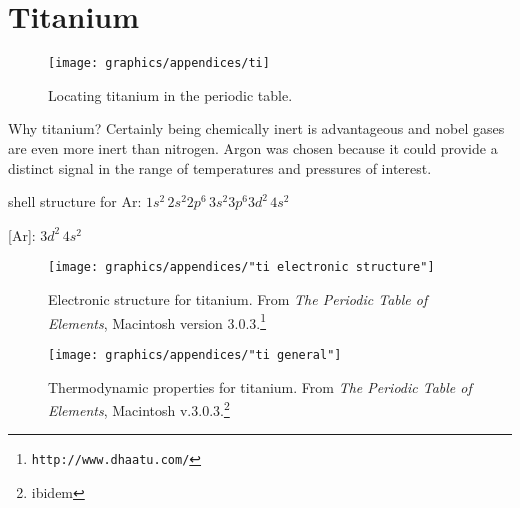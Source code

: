 \chapter{Titanium}

\begin{figure}[htbp] %
   \centering
   \texttt{[image: graphics/appendices/ti]} 
   \caption[Locating titanium in the periodic table]{Locating titanium in the periodic table.}
   \label{fig:ti:wiki}
\end{figure}

Why titanium? Certainly being chemically inert is advantageous and nobel gases are even more inert than nitrogen. Argon was chosen because it could provide a distinct signal in the range of temperatures and pressures of interest.

%
%

shell structure for Ar: $1s^{2} \, 2s^{2}2p^{6} \, 3s^{2}3p^{6} 3d^{2} \, 4s^{2}$

[Ar]: $3d^{2} \, 4s^{2}$


\begin{figure}[htbp] %
   \centering
   \texttt{[image: graphics/appendices/"ti electronic structure"]} 
   \caption[Electronic structure for titanium]{Electronic structure for titanium. From \emph{The Periodic Table of Elements}, Macintosh version 3.0.3.\footnote{\texttt{http://www.dhaatu.com/}}}
   \label{fig:ti:electronic structure}
\end{figure}

\begin{figure}[htbp] %
   \centering
   \texttt{[image: graphics/appendices/"ti general"]} 
   \caption[Thermodynamic properties for titanium]{Thermodynamic properties for titanium. From \emph{The Periodic Table of Elements}, Macintosh v.3.0.3.\footnote{ibidem}}
   \label{fig:ti:thermodynamic properties}
\end{figure}


\endinput %